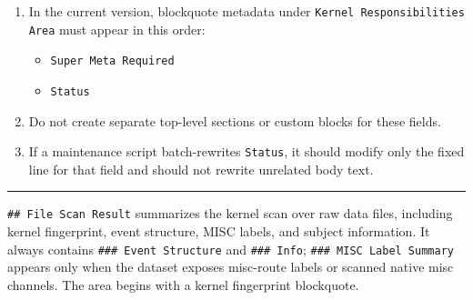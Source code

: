 \begin{tcolorbox}
\smallskip{}\par\smallskip

\begin{enumerate}[leftmargin=1.5em,noitemsep,topsep=2pt]
\item In the current version, blockquote metadata under \texttt{Kernel Responsibilities Area} must appear in this order:
\begin{itemize}[leftmargin=1.2em,noitemsep,topsep=1pt]
\item \texttt{Super Meta Required}
\item \texttt{Status}
\end{itemize}
\item Do not create separate top-level sections or custom blocks for these fields.
\item If a maintenance script batch-rewrites \texttt{Status}, it should modify only the fixed line for that field and should not rewrite unrelated body text.
\end{enumerate}

\medskip{}
\par\nopagebreak\noindent\rule{\linewidth}{0.4pt}\par\smallskip

\noindent \texttt{\#\# File Scan Result} summarizes the kernel scan over raw data files, including kernel fingerprint, event structure, MISC labels, and subject information. It always contains \texttt{\#\#\# Event Structure} and \texttt{\#\#\# Info}; \texttt{\#\#\# MISC Label Summary} appears only when the dataset exposes misc-route labels or scanned native misc channels. The area begins with a kernel fingerprint blockquote.\par\smallskip

\smallskip{}\par\smallskip


\end{tcolorbox}
